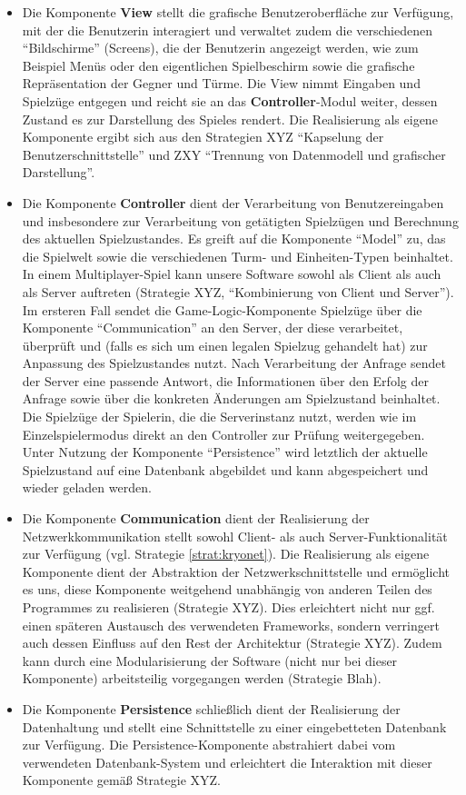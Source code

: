 \documentclass[enabledeprecatedfontcommands,fontsize=12pt,paper=a4,twoside,parskip=half]{scrartcl}
\begin{document}
\begin{itemize}
    \item Die Komponente \textbf{View} stellt die grafische Benutzeroberfläche zur Verfügung, mit der die Benutzerin interagiert und verwaltet zudem die verschiedenen \enquote{Bildschirme} (Screens), die der Benutzerin angezeigt werden, wie zum Beispiel Menüs oder den eigentlichen Spielbeschirm sowie die grafische Repräsentation der Gegner und Türme. Die View nimmt Eingaben und Spielzüge entgegen und reicht sie an das \textbf{Controller}-Modul weiter, dessen Zustand es zur Darstellung des Spieles rendert. Die Realisierung als eigene Komponente ergibt sich aus den Strategien XYZ \enquote{Kapselung der Benutzerschnittstelle} und ZXY \enquote{Trennung von Datenmodell und grafischer Darstellung}.
    \item Die Komponente \textbf{Controller} dient der Verarbeitung von Benutzereingaben und insbesondere zur Verarbeitung von getätigten Spielzügen und Berechnung des aktuellen Spielzustandes. Es greift auf die Komponente \enquote{Model} zu, das die Spielwelt sowie die verschiedenen Turm- und Einheiten-Typen beinhaltet. In einem Multiplayer-Spiel kann unsere Software sowohl als Client als auch als Server auftreten (Strategie XYZ, \enquote{Kombinierung von Client und Server}). Im ersteren Fall sendet die Game-Logic-Komponente Spielzüge über die Komponente \enquote{Communication} an den Server, der diese verarbeitet, überprüft und (falls es sich um einen legalen Spielzug gehandelt hat) zur Anpassung des Spielzustandes nutzt. Nach Verarbeitung der Anfrage sendet der Server eine passende Antwort, die Informationen über den Erfolg der Anfrage sowie über die konkreten Änderungen am Spielzustand beinhaltet. Die Spielzüge der Spielerin, die die Serverinstanz nutzt, werden wie im Einzelspielermodus direkt an den Controller zur Prüfung weitergegeben. Unter Nutzung der Komponente \enquote{Persistence} wird letztlich der aktuelle Spielzustand auf eine Datenbank abgebildet und kann abgespeichert und wieder geladen werden.
    \item Die Komponente \textbf{Communication} dient der Realisierung der Netzwerkkommunikation stellt sowohl Client- als auch Server-Funktionalität zur Verfügung (vgl. Strategie \ref{strat:kryonet}). Die Realisierung als eigene Komponente dient der Abstraktion der Netzwerkschnittstelle und ermöglicht es uns, diese Komponente weitgehend unabhängig von anderen Teilen des Programmes zu realisieren (Strategie XYZ). Dies erleichtert nicht nur ggf. einen späteren Austausch des verwendeten Frameworks, sondern verringert auch dessen Einfluss auf den Rest der Architektur (Strategie XYZ). Zudem kann durch eine Modularisierung der Software (nicht nur bei dieser Komponente) arbeitsteilig vorgegangen werden (Strategie Blah).
    \item Die Komponente \textbf{Persistence} schließlich dient der Realisierung der Datenhaltung und stellt eine Schnittstelle zu einer eingebetteten Datenbank zur Verfügung. Die Persistence-Komponente abstrahiert dabei vom verwendeten Datenbank-System und erleichtert die Interaktion mit dieser Komponente gemäß Strategie XYZ. 
\end{itemize}
\end{document}
